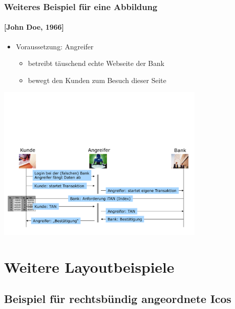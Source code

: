 \documentclass[t,aspectratio=169]{beamer}
\begin{document}
\begin{frame}
	\frametitle{Weiteres Beispiel für eine Abbildung}
	\framesubtitle{[John Doe, 1966]}
	\begin{itemize}
		\item Voraussetzung: {\color{black} Angreifer} 
			\begin{itemize}
				\item betreibt täuschend echte Webseite der Bank
				\item bewegt den Kunden zum Besuch dieser Seite
			\end{itemize}
	\end{itemize}
	\vspace{\fill}
	\begin{center}
		\includegraphics[width=0.75\textwidth]{../pic/abbildung3.pdf}
	\end{center}
\end{frame}

\section{Weitere Layoutbeispiele} %
\subsection{Beispiel für rechtsbündig angeordnete Icos} %
\end{document}
